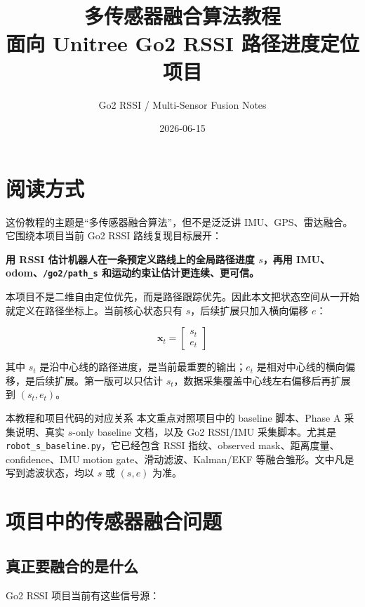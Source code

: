 \documentclass[11pt,a4paper,openany]{report}
\title{
  \Huge 多传感器融合算法教程\\
  \Large 面向 Unitree Go2 RSSI 路径进度定位项目
}
\author{Go2 RSSI / Multi-Sensor Fusion Notes}
\date{2026-06-15}
\newcommand{\file}[1]{\nolinkurl{#1}}
\newcommand{\topic}[1]{\nolinkurl{#1}}
\begin{document}
\maketitle
\tableofcontents

\chapter*{阅读方式}

这份教程的主题是“多传感器融合算法”，但不是泛泛讲 IMU、GPS、雷达融合。它围绕本项目当前 Go2 RSSI 路线复现目标展开：

\begin{center}
  \textbf{用 RSSI 估计机器人在一条预定义路线上的全局路径进度 \(s\)，再用 IMU、odom、\topic{/go2/path_s} 和运动约束让估计更连续、更可信。}
\end{center}

本项目不是二维自由定位优先，而是路径跟踪优先。因此本文把状态空间从一开始就定义在路径坐标上。当前核心状态只有 \(s\)，后续扩展只加入横向偏移 \(e\)：

\[
  \bm{x}_t =
  \begin{bmatrix}
    s_t \\
    e_t
  \end{bmatrix}
\]

其中 \(s_t\) 是沿中心线的路径进度，是当前最重要的输出；\(e_t\) 是相对中心线的横向偏移，是后续扩展。第一版可以只估计 \(s_t\)，数据采集覆盖中心线左右偏移后再扩展到 \((s_t,e_t)\)。

\begin{notebox}{本教程和项目代码的对应关系}
本文重点对照项目中的 baseline 脚本、Phase A 采集说明、真实 \(s\)-only baseline 文档，以及 Go2 RSSI/IMU 采集脚本。尤其是 \file{robot_s_baseline.py}，它已经包含 RSSI 指纹、observed mask、距离度量、confidence、IMU motion gate、滑动滤波、Kalman/EKF 等融合雏形。文中凡是写到滤波状态，均以 \(s\) 或 \((s,e)\) 为准。
\end{notebox}

\chapter{项目中的传感器融合问题}
\label{chap:problem}

\section{真正要融合的是什么}

Go2 RSSI 项目当前有这些信号源：
\end{document}
